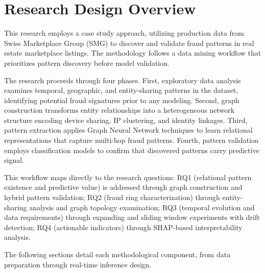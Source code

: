 \section{Research Design Overview}
\label{sec:3_1}

This research employs a case study approach, utilizing production data from Swiss Marketplace Group (SMG) to discover and validate fraud patterns in real estate marketplace listings. The methodology follows a data mining workflow that prioritizes pattern discovery before model validation.

The research proceeds through four phases. First, exploratory data analysis examines temporal, geographic, and entity-sharing patterns in the dataset, identifying potential fraud signatures prior to any modeling. Second, graph construction transforms entity relationships into a heterogeneous network structure encoding device sharing, IP clustering, and identity linkages. Third, pattern extraction applies Graph Neural Network techniques to learn relational representations that capture multi-hop fraud patterns. Fourth, pattern validation employs classification models to confirm that discovered patterns carry predictive signal.

This workflow maps directly to the research questions: RQ1 (relational pattern existence and predictive value) is addressed through graph construction and hybrid pattern validation; RQ2 (fraud ring characterization) through entity-sharing analysis and graph topology examination; RQ3 (temporal evolution and data requirements) through expanding and sliding window experiments with drift detection; RQ4 (actionable indicators) through SHAP-based interpretability analysis.

The following sections detail each methodological component, from data preparation through real-time inference design.
